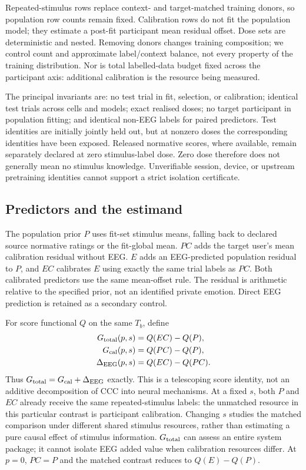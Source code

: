 \documentclass{article}
\begin{document}
Repeated-stimulus rows replace context- and target-matched training donors, so
population row counts remain fixed. Calibration rows do not fit the population
model; they estimate a post-fit participant mean residual offset. Dose sets
are deterministic and nested. Removing donors changes training composition;
we control count and approximate label/context balance, not every property of
the training distribution. Nor is total labelled-data budget fixed across the
participant axis: additional calibration is the resource being measured.

The principal invariants are: no test trial in fit, selection, or calibration;
identical test trials across cells and models; exact realised doses; no target
participant in population fitting; and identical non-EEG labels for paired
predictors. Test identities are initially jointly held out, but at nonzero
doses the corresponding identities have been exposed. Released normative
scores, where available, remain separately declared at zero stimulus-label
dose. Zero dose therefore does not generally mean no stimulus knowledge.
Unverifiable session, device, or upstream pretraining identities cannot support
a strict isolation certificate.

\subsection{Predictors and the estimand}
The population prior $P$ uses fit-set stimulus means, falling back to declared
source normative ratings or the fit-global mean. $PC$ adds the target user's
mean calibration residual without EEG. $E$ adds an EEG-predicted population
residual to $P$, and $EC$ calibrates $E$ using exactly the same trial labels as
$PC$. Both calibrated predictors use the same mean-offset rule. The residual
is arithmetic relative to the specified prior, not an identified private
emotion. Direct EEG prediction is retained as a secondary control.

For score functional $Q$ on the same $T_b$, define
\begin{align}
G_{\rm total}(p,s)&=Q(EC)-Q(P),\\
G_{\rm cal}(p,s)&=Q(PC)-Q(P),\\
\Delta_{\rm EEG}(p,s)&=Q(EC)-Q(PC).
\label{eq:matched-increment}
\end{align}
Thus $G_{\rm total}=G_{\rm cal}+\Delta_{\rm EEG}$ exactly. This is a
telescoping score identity, not an additive decomposition of CCC into neural
mechanisms. At a fixed $s$, both $P$ and $EC$ already receive the same
repeated-stimulus labels: the unmatched resource in this particular contrast
is participant calibration. Changing $s$ studies the matched comparison under
different shared stimulus resources, rather than estimating a pure causal
effect of stimulus information. $G_{\rm total}$ can assess an entire system package; it cannot
isolate EEG added value when calibration resources differ. At $p=0$, $PC=P$
and the matched contrast reduces to $Q(E)-Q(P)$.
\end{document}
